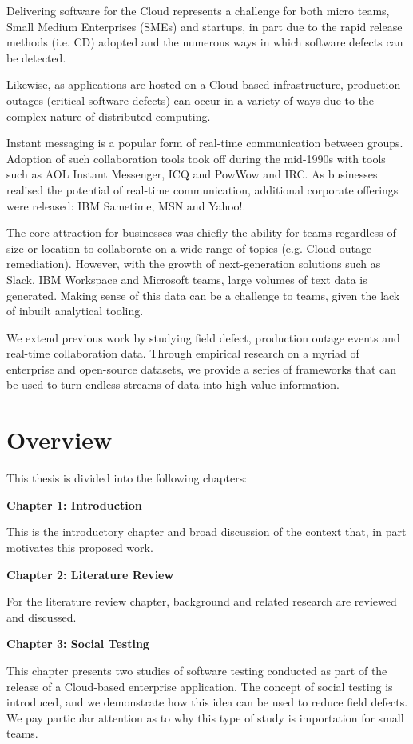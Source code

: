 Delivering software for the Cloud represents a challenge for both micro teams, Small Medium Enterprises (SMEs) and startups, in part due to the rapid release methods (i.e. CD) adopted and the numerous ways in which software defects can be detected. 

Likewise, as applications are hosted on a Cloud-based infrastructure, production outages (critical software defects) can occur in a variety of ways due to the complex nature of distributed computing.

Instant messaging is a popular form of real-time communication between groups. Adoption of such collaboration tools took off during the mid-1990s with tools such as AOL Instant Messenger, ICQ and PowWow and IRC. As businesses realised the potential of real-time communication, additional corporate offerings were released: IBM Sametime, MSN and Yahoo!. 

The core attraction for businesses was chiefly the ability for teams regardless of size or location to collaborate on a wide range of topics (e.g. Cloud outage remediation). However, with the growth of next-generation solutions such as Slack, IBM Workspace and Microsoft teams, large volumes of text data is generated. Making sense of this data can be a challenge to teams, given the lack of inbuilt analytical tooling.

We extend previous work by studying field defect, production outage events and real-time collaboration data. Through empirical research on a myriad of enterprise and open-source datasets, we provide a series of frameworks that can be used to turn endless streams of data into high-value information.

\section{Overview}
This thesis is divided into the following chapters:

\textbf{Chapter 1: Introduction}

This is the introductory chapter and broad discussion of the context that, in part motivates this proposed work.

\textbf{Chapter 2: Literature Review}

For the literature review chapter, background and related research are reviewed and discussed.

\textbf{Chapter 3: Social Testing}

This chapter presents two studies of software testing conducted as part of the release of a Cloud-based enterprise application. The concept of social testing is introduced, and we demonstrate how this idea can be used to reduce field defects. We pay particular attention as to why this type of study is importation for small teams. 

